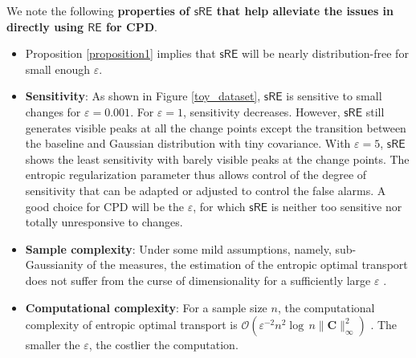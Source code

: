 \documentclass{article}
\begin{document}
We note the following \textbf{properties of $\mathsf{sRE}$ that help alleviate the issues in directly using $\mathsf{RE}$ for CPD}. 
\vspace{-1mm}
\begin{itemize}[leftmargin=*]
\setlength \itemsep{-4pt}
    \item Proposition \eqref{proposition1} implies that {\small$\mathsf{sRE}$} will be nearly distribution-free for small enough $\varepsilon$.
    
    \item \textbf{Sensitivity}: As shown in Figure \ref{toy_dataset}, {\small $\mathsf{sRE}$} is sensitive to small changes for $\varepsilon= 0.001$. For $\varepsilon = 1$, sensitivity decreases. However, {\small $\mathsf{sRE}$} still generates visible peaks at all the change points except the transition between the baseline and Gaussian distribution with tiny covariance. With $\varepsilon=5$, {\small $\mathsf{sRE}$} shows the least sensitivity with barely visible peaks at the change points. The entropic regularization parameter thus allows control of the degree of sensitivity that can be adapted or adjusted to control the false alarms. A good choice for CPD will be the  $\varepsilon$, for which {\small $\mathsf{sRE}$} is neither too sensitive nor totally unresponsive to changes.
    
    
    
    
    
    \item \textbf{Sample complexity}: Under some mild assumptions, namely, sub-Gaussianity of the measures, the estimation of the entropic optimal transport does not suffer from the curse of dimensionality for a sufficiently large $\varepsilon$ \cite{genevay2019sample}.
    
    \item \textbf{Computational complexity}: For a sample size $n$, the computational complexity of entropic optimal transport is {\small $\mathcal O(\varepsilon^{-2} n^2 \log\, n\|\mathbf C\|_\infty^2)$} \cite{peyre2019computational}. The smaller the $\varepsilon$, the costlier the computation. 
\end{itemize}
\end{document}
